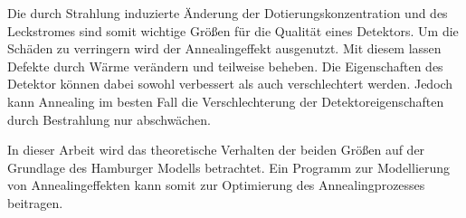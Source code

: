 Die durch Strahlung induzierte Änderung der Dotierungskonzentration und des Leckstromes sind
somit wichtige Größen für die Qualität eines Detektors.
Um die Schäden zu verringern wird der Annealingeffekt ausgenutzt. Mit diesem lassen
Defekte durch Wärme verändern und teilweise beheben. Die Eigenschaften des Detektor können
dabei sowohl verbessert als auch verschlechtert werden.
Jedoch kann Annealing im besten Fall die Verschlechterung der Detektoreigenschaften durch Bestrahlung nur
abschwächen.

In dieser Arbeit wird das
theoretische Verhalten der beiden Größen auf der Grundlage des Hamburger Modells betrachtet.
Ein Programm zur Modellierung von Annealingeffekten kann somit zur
Optimierung des Annealingprozesses beitragen.
